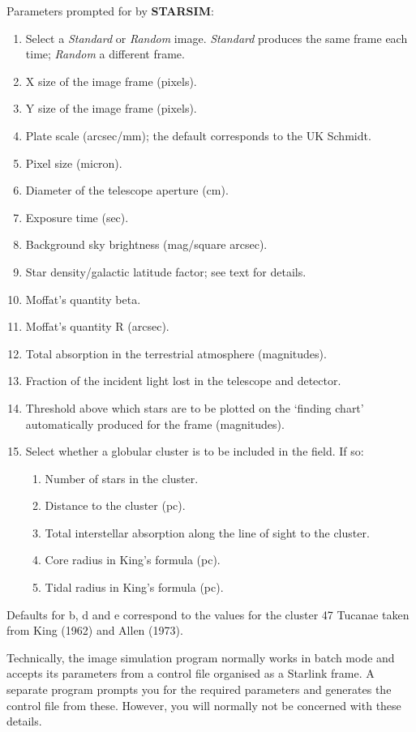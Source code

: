 Parameters prompted for by {\bf STARSIM}:
\begin{enumerate}
\item Select a {\em Standard} or {\em Random} image.
{\em Standard} produces the same frame each time; {\em Random} a different
frame.
\item X size of the image frame (pixels).
\item Y size of the image frame (pixels).
\item Plate scale (arcsec/mm); the default corresponds to the UK Schmidt.
\item Pixel size (micron).
\item Diameter of the telescope aperture (cm).
\item Exposure time (sec).
\item Background sky brightness (mag/square arcsec).
\item Star density/galactic latitude factor; see text for details.
\item Moffat's quantity beta.
\item Moffat's quantity R (arcsec).
\item Total absorption in the terrestrial atmosphere (magnitudes).
\item Fraction of the incident light lost in the telescope and detector.
\item Threshold above which stars are to be plotted on the `finding chart'
automatically produced for the frame (magnitudes).
\item Select whether a globular cluster is to be included in the field. If so:
\begin{enumerate}
\item Number of stars in the cluster.
\item Distance to the cluster (pc).
\item Total interstellar absorption along the line of sight to the cluster.
\item Core radius in King's formula (pc).
\item Tidal radius in King's formula (pc).
\end{enumerate}
\end{enumerate}
Defaults for b, d and e correspond to the values for the cluster 47 Tucanae
taken from King (1962) and Allen (1973).

Technically, the image simulation program normally works in batch mode and
accepts its parameters from a control file organised as a Starlink frame.
A separate program prompts you for the required parameters and generates the
control file from these.
However, you will normally not be concerned with these details.

